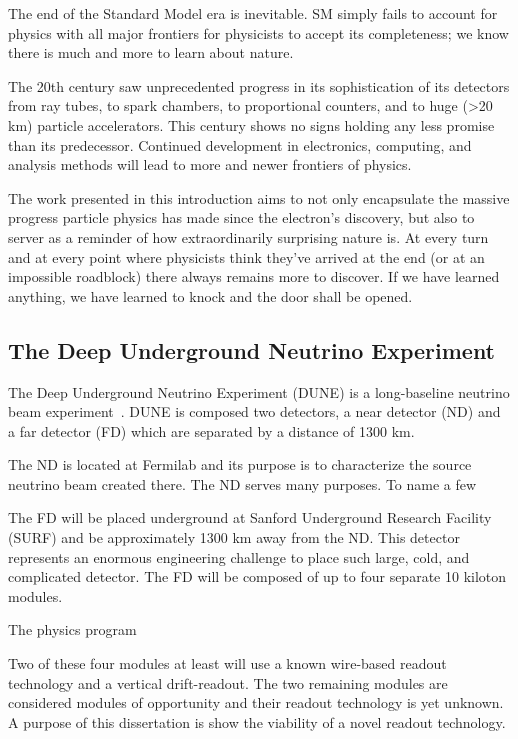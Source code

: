 The end of the Standard Model era is inevitable.
SM simply fails to account for physics with all major frontiers for physicists to accept its completeness; we know there is much and more to learn about nature.

The 20th century saw unprecedented progress in its sophistication of its detectors from ray tubes, to spark chambers, to proportional counters, and to huge (>20 km) particle accelerators.
This century shows no signs holding any less promise than its predecessor.
Continued development in electronics, computing, and analysis methods will lead to more and newer frontiers of physics.

The work presented in this introduction aims to not only encapsulate the massive progress particle physics has made since the electron's discovery, but also to server as a reminder of how extraordinarily surprising nature is.
At every turn and at every point where physicists think they've arrived at the end (or at an impossible roadblock) there always remains more to discover.
If we have learned anything, we have learned to knock and the door shall be opened.


\subsection{The Deep Underground Neutrino Experiment}

The Deep Underground Neutrino Experiment (DUNE) is a long-baseline neutrino beam experiment~\citep{DUNE_TDR_V1_Abi_2020, DUNE_FD_TDRv2_2020, DUNE_TDRv3_Abi_2020, DUNE-FD_TDRv4:Abi_2020}.
DUNE is composed two detectors, a near detector (ND) and a far detector (FD) which are separated by a distance of 1300 km.

The ND is located at Fermilab and its purpose is to characterize the source neutrino beam created there.
The ND serves many purposes.
To name a few

The FD will be placed underground at Sanford Underground Research Facility (SURF) and be approximately 1300 km away from the ND.
This detector represents an enormous engineering challenge to place such large, cold, and complicated detector.
The FD will be composed of up to four separate 10 kiloton modules.


The physics program

Two of these four modules at least will use a known wire-based readout technology and a vertical drift-readout.
The two remaining modules are considered modules of opportunity and their readout technology is yet unknown.
A purpose of this dissertation is show the viability of a novel readout technology.

